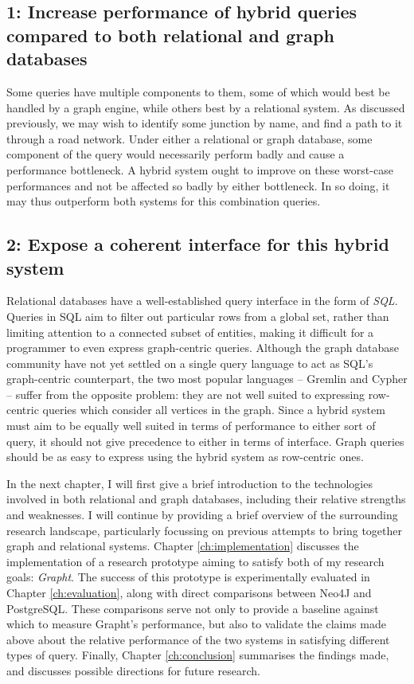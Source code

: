 \subsection*{1: Increase performance of hybrid queries compared to both relational and graph databases}

Some queries have multiple components to them, some of which would best be
handled by a graph engine, while others best by a relational system. As
discussed previously, we may wish to identify some junction by name, and find
a path to it through a road network. Under either a relational or graph
database, some component of the query would necessarily perform badly and
cause a performance bottleneck. A hybrid system ought to improve on these
worst-case performances and not be affected so badly by either bottleneck. In
so doing, it may thus outperform both systems for this combination queries.

\subsection*{2: Expose a coherent interface for this hybrid system}

Relational databases have a well-established query interface in the form of
\textit{SQL}.  Queries in SQL aim to filter out particular rows from a global set, rather than limiting attention to a connected subset of entities, making it difficult for a
programmer to even express graph-centric queries. Although the graph database
community have not yet settled on a single query language to act as SQL's
graph-centric counterpart, the two most popular languages -- Gremlin and Cypher
-- suffer from the opposite problem: they are not well suited to expressing
row-centric queries which consider all vertices in the graph. Since a hybrid system
must aim to be equally well suited in terms of performance to either sort of
query, it should not give precedence to either in terms of interface. Graph
queries should be as easy to express using the hybrid system as row-centric
ones.


In the next chapter, I will first give a brief introduction to the
technologies involved in both relational and graph databases, including their
relative strengths and weaknesses. I will continue by providing a brief
overview of the surrounding research landscape, particularly  focussing on
previous attempts to bring together graph and relational systems. Chapter
\ref{ch:implementation} discusses the implementation of a research prototype
aiming to satisfy both of my research goals: \textit{Grapht}. The success of
this prototype is experimentally evaluated in Chapter \ref{ch:evaluation},
along with direct comparisons between Neo4J and PostgreSQL. These comparisons
serve not only to provide a baseline against which to measure Grapht's
performance, but also to validate the claims made above about the relative
performance of the two systems in satisfying different types of query.
Finally, Chapter \ref{ch:conclusion} summarises the findings made, and
discusses possible directions for future research.
